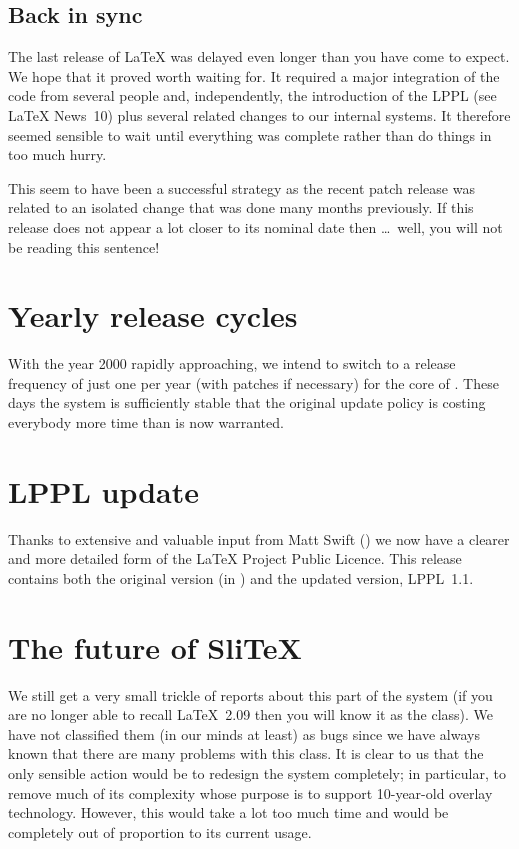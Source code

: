 \documentclass{ltnews}
\begin{document}
\maketitle

\subsection{Back in sync}

The last release of \LaTeX{} was delayed even longer than you have
come to expect.  We hope that it proved worth waiting for.  It
required a major integration of the code from several people and,
independently, the introduction of the LPPL (see \LaTeX{} News~10) plus
several related changes to our internal systems.  It therefore seemed
sensible to wait until everything was complete rather than do things
in too much hurry.

This seem to have been a successful strategy as
the recent patch release was related to an isolated change that was
done many months previously.  If this release does not appear a lot
closer to its nominal date then \ldots~well, you will not be reading
this sentence!

\section{Yearly release cycles}

With the year 2000 rapidly approaching, we intend to switch to a
release frequency of just one per year (with patches if necessary) for
the core of \LaTeXe{}. These days the system is sufficiently stable
that the original update policy is costing everybody more time than is
now warranted.

\section{LPPL update}

Thanks to extensive and valuable input from Matt Swift
() we now have a clearer and more detailed
form of the \LaTeX{} Project Public Licence.  This release contains
both the original version (in ) and the updated
version, LPPL~1.1.

\section{The future of Sli\TeX{}}

We still get a very small trickle of reports about this part of the
system (if you are no longer able to recall \LaTeX~2.09 then you will
know it as the  class).  We have not classified them (in
our minds at least) as bugs since we have always known that there are
many problems with this class.  It is clear to us that the only
sensible action would be to redesign the system completely; in
particular, to remove much of its complexity whose purpose is to
support 10-year-old overlay technology.  However, this would take a
lot too much time and would be completely out of proportion to its
current usage.
\end{document}
